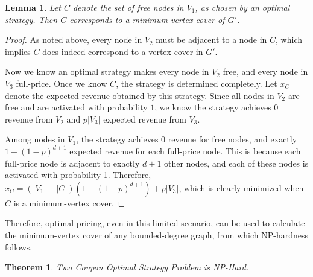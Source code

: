 \documentclass[letterpaper,twoside]{article}
\newtheorem{lemma}{Lemma}
\newtheorem{theorem}{Theorem}
\begin{document}
\begin{lemma} \label{lem:v1}
    Let $C$ denote the set of free nodes in $V_1$, as chosen by an
    optimal strategy. Then $C$ corresponds to a minimum vertex cover
    of $G'$.
\end{lemma}
\begin{proof}
    As noted above, every node in $V_2$ must be adjacent to a node
    in $C$, which implies $C$ does indeed correspond to a vertex
    cover in $G'$.

    Now we know an optimal strategy makes every node in $V_2$ free,
    and every node in $V_3$ full-price. Once we know $C$, the strategy
    is determined completely. Let $x_C$ denote the expected revenue
    obtained by this strategy. Since all nodes in $V_2$ are free and
    are activated with probability $1$, we know the strategy achieves
    0 revenue from $V_2$ and $p|V_3|$ expected revenue from $V_3$.

    Among nodes in $V_1$, the strategy achieves 0 revenue for free
    nodes, and exactly $1 - (1-p)^{d+1}$ expected revenue for each
    full-price node. This is because each full-price node is
    adjacent to exactly $d+1$ other nodes, and each of these nodes
    is activated with probability 1. Therefore,
    $x_C = (|V_1| - |C|)(1 - (1-p)^{d+1}) + p|V_3|$, which is clearly
    minimized when $C$ is a minimum-vertex cover.
\end{proof}

Therefore, optimal pricing, even in this limited scenario, can be
used to calculate the minimum-vertex cover of any bounded-degree
graph, from which NP-hardness follows.

\begin{theorem} \label{lem:twocoupon}
  Two Coupon Optimal Strategy Problem is NP-Hard.
\end{theorem}
\end{document}
